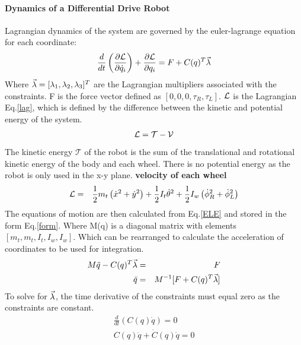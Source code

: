 \documentclass[MTRX3700report.tex]{subfiles}
\begin{document}
\paragraph{Dynamics of a Differential Drive Robot}
Lagrangian dynamics of the system are governed by the euler-lagrange equation for each coordinate:
\begin{eqnarray}
\frac{d}{dt}\left( \frac{\partial \mathcal{L}}{\partial \dot{q}_i} \right)+\frac{\partial \mathcal{L}}{\partial q_i} = F + C(q)^T\vec{\lambda} \label{ELE}
\end{eqnarray}
Where $\vec{\lambda} = [\lambda_1,\lambda_2,\lambda_3]^T$ are the Lagrangian multipliers associated with the constraints. F is the force vector defined as $[0,0,0,\tau_R,\tau_L]$. $\mathcal{L}$ is the Lagrangian Eq.\ref{lag}, which is defined by the difference between the kinetic and potential energy of the system.
\begin{eqnarray}
\mathcal{L} = \mathcal{T}-\mathcal{V} \label{lag}
\end{eqnarray}
The kinetic energy $\mathcal{T}$ of the robot is the sum of the translational and rotational kinetic energy of the body and each wheel. There is no potential energy as the robot is only used in the x-y plane. \textbf{velocity of each wheel}
\begin{eqnarray}
\mathcal{L} &=& \frac{1}{2}m_t\left( \dot{x}^2+\dot{y}^2 \right) + \frac{1}{2}I_t\dot{\theta}^2+\frac{1}{2}I_w\left( \dot{\phi}_R^2 + \dot{\phi}_L^2\right)
\end{eqnarray}
The equations of motion are then calculated from Eq.\eqref{ELE} and stored in the form Eq.\ref{form}. Where M(q) is a diagonal matrix with elements $[m_t,m_t,I_t,I_w,I_w]$. Which can be rearranged to calculate the acceleration of coordinates to be used for integration.
\begin{eqnarray}
M\ddot{q}-C(q)^T\vec{\lambda} &=& F \label{form}\\
\ddot{q} &=& M^{-1}[F+C(q)^T\vec{\lambda}] \label{qdd}
\end{eqnarray}
To solve for $\vec{\lambda}$, the time derivative of the constraints must equal zero as the constraints are constant.
\begin{eqnarray}
\frac{d}{dt}\left( C(q)\dot{q}\right) = 0\\
C(q)\ddot{q}+\dot{C}(q)\dot{q} = 0 \label{dc}
\end{eqnarray}
\end{document}
